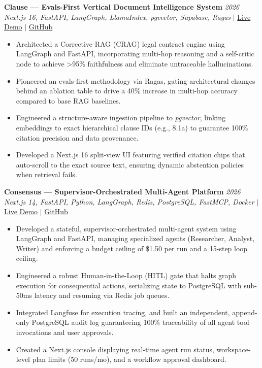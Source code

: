 \documentclass[11pt, a4paper]{article}
\begin{document}
\textbf{Clause — Evals-First Vertical Document Intelligence System} \hfill \textit{2026} \\
\textit{Next.js 16, FastAPI, LangGraph, LlamaIndex, pgvector, Supabase, Ragas} $|$ \href{https://clause-beige.vercel.app/}{Live Demo} $|$ \href{https://github.com/SShayanHussain/clause}{GitHub}
\begin{itemize}[leftmargin=0.25in, itemsep=2pt]
    \item Architected a Corrective RAG (CRAG) legal contract engine using LangGraph and FastAPI, incorporating multi-hop reasoning and a self-critic node to achieve >95\% faithfulness and eliminate untraceable hallucinations.
    \item Pioneered an evals-first methodology via Ragas, gating architectural changes behind an ablation table to drive a 40\% increase in multi-hop accuracy compared to base RAG baselines.
    \item Engineered a structure-aware ingestion pipeline to \textit{pgvector}, linking embeddings to exact hierarchical clause IDs (e.g., 8.1a) to guarantee 100\% citation precision and data provenance.
    \item Developed a Next.js 16 split-view UI featuring verified citation chips that auto-scroll to the exact source text, ensuring dynamic abstention policies when retrieval fails.
\end{itemize}

\textbf{Consensus — Supervisor-Orchestrated Multi-Agent Platform} \hfill \textit{2026} \\
\textit{Next.js 14, FastAPI, Python, LangGraph, Redis, PostgreSQL, FastMCP, Docker} $|$ \href{https://consensus-ai-saas.vercel.app/}{Live Demo} $|$ \href{https://github.com/SShayanHussain/consensus}{GitHub}
\begin{itemize}[leftmargin=0.25in, itemsep=2pt]
    \item Developed a stateful, supervisor-orchestrated multi-agent system using LangGraph and FastAPI, managing specialized agents (Researcher, Analyst, Writer) and enforcing a budget ceiling of \$1.50 per run and a 15-step loop ceiling.
    \item Engineered a robust Human-in-the-Loop (HITL) gate that halts graph execution for consequential actions, serializing state to PostgreSQL with sub-50ms latency and resuming via Redis job queues.
    \item Integrated Langfuse for execution tracing, and built an independent, append-only PostgreSQL audit log guaranteeing 100\% traceability of all agent tool invocations and user approvals.
    \item Created a Next.js console displaying real-time agent run status, workspace-level plan limits (50 runs/mo), and a workflow approval dashboard.
\end{itemize}
\end{document}
